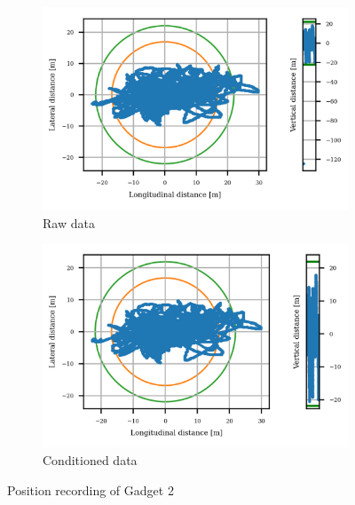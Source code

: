 \documentclass{article}
\begin{document}
			\begin{figure}[h]
		   		\centering
		     	\begin{subfigure}[b]{0.45\textwidth}
		      		\centering
		      	  	\includegraphics[width=\textwidth]{Static/raw_static_MTK 3339.png}
		      	  	\caption{Raw data}
		     	\end{subfigure}
		     	\begin{subfigure}[b]{0.45\textwidth}
		      	   \centering
		      	   \includegraphics[width=\textwidth]{Static/cond_static_MTK 3339.png}
		      	   \caption{Conditioned data}
		     	\end{subfigure}
		     	
		      \caption{Position recording of Gadget 2}
		      \label{fig:static_loc_gadget2}
			\end{figure}		
\end{document}
